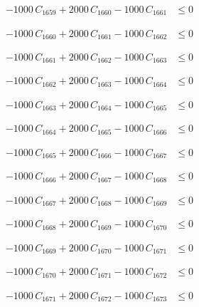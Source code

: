 \documentclass[a4paper,11pt]{article}
\begin{document}
\begin{align}
-1000\,C_{1659} + 2000\,C_{1660} - 1000\,C_{1661} &\leq 0 \nonumber
\end{align}

\begin{align}
-1000\,C_{1660} + 2000\,C_{1661} - 1000\,C_{1662} &\leq 0 \nonumber
\end{align}

\begin{align}
-1000\,C_{1661} + 2000\,C_{1662} - 1000\,C_{1663} &\leq 0 \nonumber
\end{align}

\begin{align}
-1000\,C_{1662} + 2000\,C_{1663} - 1000\,C_{1664} &\leq 0 \nonumber
\end{align}

\begin{align}
-1000\,C_{1663} + 2000\,C_{1664} - 1000\,C_{1665} &\leq 0 \nonumber
\end{align}

\begin{align}
-1000\,C_{1664} + 2000\,C_{1665} - 1000\,C_{1666} &\leq 0 \nonumber
\end{align}

\begin{align}
-1000\,C_{1665} + 2000\,C_{1666} - 1000\,C_{1667} &\leq 0 \nonumber
\end{align}

\begin{align}
-1000\,C_{1666} + 2000\,C_{1667} - 1000\,C_{1668} &\leq 0 \nonumber
\end{align}

\begin{align}
-1000\,C_{1667} + 2000\,C_{1668} - 1000\,C_{1669} &\leq 0 \nonumber
\end{align}

\begin{align}
-1000\,C_{1668} + 2000\,C_{1669} - 1000\,C_{1670} &\leq 0 \nonumber
\end{align}

\begin{align}
-1000\,C_{1669} + 2000\,C_{1670} - 1000\,C_{1671} &\leq 0 \nonumber
\end{align}

\begin{align}
-1000\,C_{1670} + 2000\,C_{1671} - 1000\,C_{1672} &\leq 0 \nonumber
\end{align}

\begin{align}
-1000\,C_{1671} + 2000\,C_{1672} - 1000\,C_{1673} &\leq 0 \nonumber
\end{align}
\end{document}
